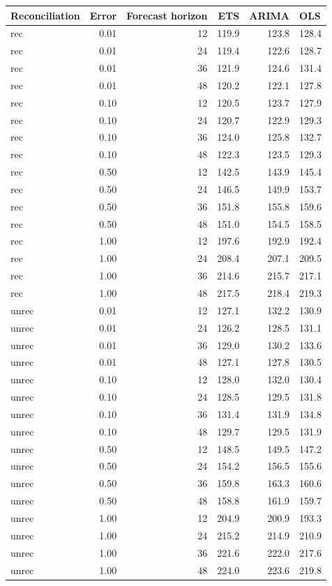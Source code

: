 \documentclass[11pt,a4paper,]{article}
\let\origtable\table
\let\endorigtable\endtable
\renewenvironment{table}[1][2] {
    \expandafter\origtable\expandafter[!htbp]
} {
    \endorigtable
}
\begin{document}
\begin{table}[!h]

\caption{\label{tab:TourismdatasimrollingnoiseFH}Mean RMSE on one to four year test set with different error levels for ETS, ARIMA and OLS with and without reconciliation - Rolling origin - 304 bottom level series and 8 levels of hierarchy - Simulated tourism dataset}
\centering
\begin{tabular}[t]{lrrrrl}
\toprule
Reconciliation & Error & Forecast horizon & ETS & ARIMA & OLS\\
\midrule
rec & 0.01 & 12 & 119.9 & 123.8 & 128.4\\
rec & 0.01 & 24 & 119.4 & 122.6 & 128.7\\
rec & 0.01 & 36 & 121.9 & 124.6 & 131.4\\
rec & 0.01 & 48 & 120.2 & 122.1 & 127.8\\
rec & 0.10 & 12 & 120.5 & 123.7 & 127.9\\
rec & 0.10 & 24 & 120.7 & 122.9 & 129.3\\
rec & 0.10 & 36 & 124.0 & 125.8 & 132.7\\
rec & 0.10 & 48 & 122.3 & 123.5 & 129.3\\
rec & 0.50 & 12 & 142.5 & 143.9 & 145.4\\
rec & 0.50 & 24 & 146.5 & 149.9 & 153.7\\
rec & 0.50 & 36 & 151.8 & 155.8 & 159.6\\
rec & 0.50 & 48 & 151.0 & 154.5 & 158.5\\
rec & 1.00 & 12 & 197.6 & 192.9 & 192.4\\
rec & 1.00 & 24 & 208.4 & 207.1 & 209.5\\
rec & 1.00 & 36 & 214.6 & 215.7 & 217.1\\
rec & 1.00 & 48 & 217.5 & 218.4 & 219.3\\
unrec & 0.01 & 12 & 127.1 & 132.2 & 130.9\\
unrec & 0.01 & 24 & 126.2 & 128.5 & 131.1\\
unrec & 0.01 & 36 & 129.0 & 130.2 & 133.6\\
unrec & 0.01 & 48 & 127.1 & 127.8 & 130.5\\
unrec & 0.10 & 12 & 128.0 & 132.0 & 130.4\\
unrec & 0.10 & 24 & 128.5 & 129.5 & 131.8\\
unrec & 0.10 & 36 & 131.4 & 131.9 & 134.8\\
unrec & 0.10 & 48 & 129.7 & 129.5 & 131.9\\
unrec & 0.50 & 12 & 148.5 & 149.5 & 147.2\\
unrec & 0.50 & 24 & 154.2 & 156.5 & 155.6\\
unrec & 0.50 & 36 & 159.8 & 163.3 & 160.6\\
unrec & 0.50 & 48 & 158.8 & 161.9 & 159.7\\
unrec & 1.00 & 12 & 204.9 & 200.9 & 193.3\\
unrec & 1.00 & 24 & 215.2 & 214.9 & 210.9\\
unrec & 1.00 & 36 & 221.6 & 222.0 & 217.6\\
unrec & 1.00 & 48 & 224.0 & 223.6 & 219.8\\
\bottomrule
\end{tabular}
\end{table}
\end{document}
